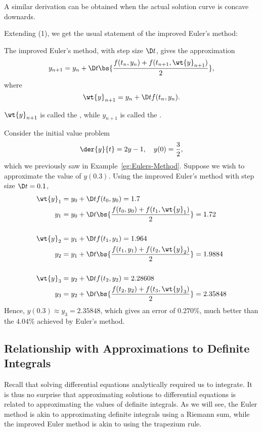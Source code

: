 A similar derivation can be obtained when the actual solution curve is concave downards.

Extending (1), we get the usual statement of the improved Euler's method:

\begin{recipe}
    The improved Euler's method, with step size $\D t$, gives the approximation \[y_{n+1} = y_n + \D t \bs{\frac{f(t_n, y_n) + f(t_{n+1}, \wt{y}_{n+1})}{2}},\] where \[\wt{y}_{n+1} = y_n + \D t f(t_n, y_n).\]
\end{recipe}

\begin{definition}
    $\wt{y}_{n + 1}$ is called the , while $y_{n+1}$ is called the .
\end{definition}

\begin{example}
    Consider the initial value problem \[\der{y}{t} = 2y - 1, \quad y(0) = \frac32,\] which we previously saw in Example~\ref{eg:Eulers-Method}. Suppose we wish to approximate the value of $y(0.3)$. Using the improved Euler's method with step size $\D t = 0.1$,
    \begin{align*}
        \wt{y}_1 &= y_0 + \D t f(t_0, y_0) = 1.7\\
        y_1 &= y_0 + \D t \bs{\frac{f(t_0, y_0) + f(t_1, \wt{y}_1)}{2}} = 1.72 \\ \\
        \wt{y}_2 &= y_1 + \D t f(t_1, y_1) = 1.964\\
        y_2 &= y_1 + \D t \bs{\frac{f(t_1, y_1) + f(t_2, \wt{y}_2)}{2}} = 1.9884 \\ \\
        \wt{y}_3 &= y_2 + \D t f(t_2, y_2) = 2.28608\\
        y_3 &= y_2 + \D t \bs{\frac{f(t_2, y_2) + f(t_3, \wt{y}_3)}{2}} = 2.35848
    \end{align*}
    Hence, $y(0.3) \approx y_3 = 2.35848$, which gives an error of $0.270\%$, much better than the $4.04\%$ achieved by Euler's method.
\end{example}

\subsection{Relationship with Approximations to Definite Integrals}

Recall that solving differential equations analytically required us to integrate. It is thus no surprise that approximating solutions to differential equations is related to approximating the values of definite integrals. As we will see, the Euler method is akin to approximating definite integrals using a Riemann sum, while the improved Euler method is akin to using the trapezium rule.

